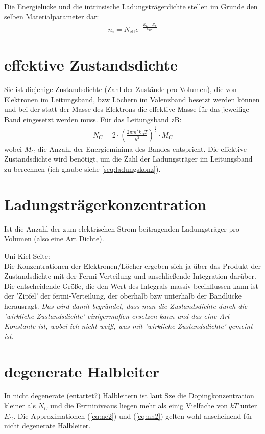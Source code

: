 \documentclass[paper=a4,10pt]{scrartcl}
\begin{document}
Die Energielücke und die intrinsische Ladungsträgerdichte stellen im Grunde den selben Materialparameter dar:
\begin{align}
n_i = N_{\text{eff}} e^{- \frac{E_L-E_F}{k_BT}}
\end{align}
\section{effektive Zustandsdichte}
\label{sec:effZD}
Sie ist diejenige Zustandsdichte (Zahl der Zustände pro Volumen), die von Elektronen im Leitungsband, bzw Löchern im Valenzband besetzt werden können und bei der statt der Masse des Elektrons die effektive Masse für das jeweilige Band eingesetzt werden muss.
Für das Leitungsband zB:
\begin{align}
N_C = 2 \cdot \left( \frac{2 \pi m^* k_B T}{h^2} \right)^{\frac{3}{2}} \cdot M_C
\end{align}
wobei $M_C$ die Anzahl der Energieminima des Bandes entspricht. Die effektive Zustandsdichte wird benötigt, um die Zahl der Ladungsträger im Leitungsband zu berechnen (ich glaube siehe \ref{seq:ladungskonz}).

\section{Ladungsträgerkonzentration}
\label{sec:carrier_concentration}
Ist die Anzahl der zum elektrischen Strom beitragenden Ladungsträger pro Volumen (also eine Art Dichte).

Uni-Kiel Seite:\\
Die Konzentrationen der Elektronen/Löcher ergeben sich ja über das Produkt der Zustandsdichte mit der Fermi-Verteilung und anschließende Integration darüber. Die entscheidende Größe, die den Wert des Integrals massiv beeinflussen kann ist der 'Zipfel' der fermi-Verteilung, der oberhalb bzw unterhalb der Bandlücke herausragt.
\textit{Das wird damit begründet, dass man die Zustandsdichte durch die 'wirkliche Zustandsdichte' einigermaßen ersetzen kann und das eine Art Konstante ist, wobei ich nicht weiß, was mit 'wirkliche Zustandsdichte' gemeint ist.}

\section{degenerate Halbleiter}
In nicht degenerate (entartet?) Halbleitern ist laut Sze die Dopingkonzentration kleiner als $N_C$ und die Ferminiveaus liegen mehr als einig Vielfache von $kT$ unter $E_C$. Die Approximationen (\ref{eq:ne2}) und (\ref{eq:nh2}) gelten wohl anscheinend für nicht degenerate Halbleiter. \\
\end{document}
